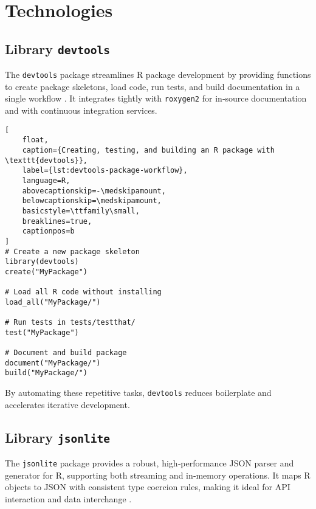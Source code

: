 
\begin{chapterabstract}
\end{chapterabstract}

\section{Technologies}

\subsection{Library \texttt{devtools}}

The \texttt{devtools} package streamlines R package development by providing functions to create package skeletons, load code, run tests, and build documentation in a single workflow \cite{wickham2019devtools}. It integrates tightly with \texttt{roxygen2} for in‐source documentation and with continuous integration services.

\begin{lstlisting}[
    float,
    caption={Creating, testing, and building an R package with \texttt{devtools}},
    label={lst:devtools-package-workflow},
    language=R,
    abovecaptionskip=-\medskipamount,
    belowcaptionskip=\medskipamount,
    basicstyle=\ttfamily\small,
    breaklines=true,
    captionpos=b
]
# Create a new package skeleton
library(devtools)
create("MyPackage")

# Load all R code without installing
load_all("MyPackage/")

# Run tests in tests/testthat/
test("MyPackage")

# Document and build package
document("MyPackage/")
build("MyPackage/")
\end{lstlisting}


By automating these repetitive tasks, \texttt{devtools} reduces boilerplate and accelerates iterative development.

\subsection{Library \texttt{jsonlite}}

The \texttt{jsonlite} package provides a robust, high‐performance JSON parser and generator for R, supporting both streaming and in‐memory operations. It maps R objects to JSON with consistent type coercion rules, making it ideal for API interaction and data interchange \cite{ooms2014jsonlite}.

